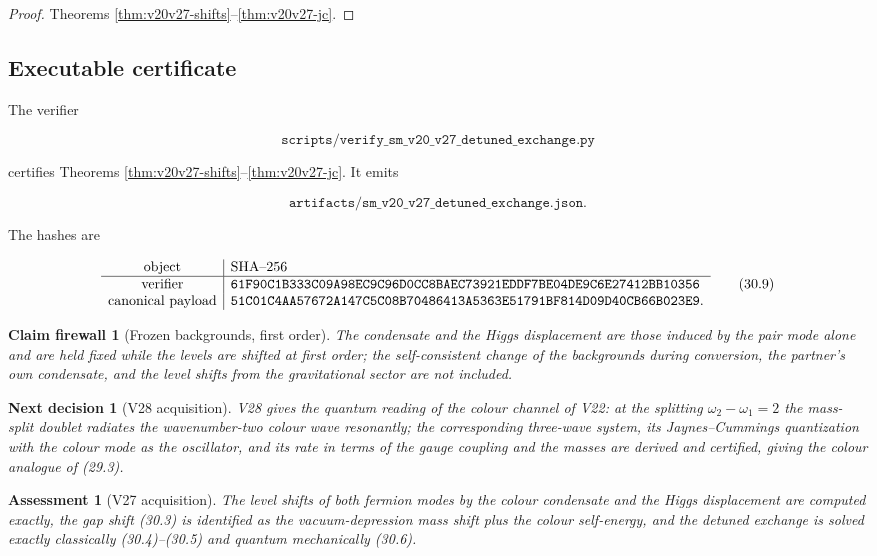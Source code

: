 \documentclass[11pt]{article}
\newtheorem{firewall}[theorem]{Claim firewall}
\newtheorem{decision}[theorem]{Next decision}
\newtheorem{assessment}[theorem]{Assessment}
\theoremstyle{remark}
\begin{document}
\begin{proof}
Theorems \ref{thm:v20v27-shifts}--\ref{thm:v20v27-jc}.
\end{proof}

\subsection{Executable certificate}

The verifier

\[
 \texttt{scripts/verify\_sm\_v20\_v27\_detuned\_exchange.py}          \tag{30.7}
\]

certifies Theorems \ref{thm:v20v27-shifts}--\ref{thm:v20v27-jc}.  It
emits

\[
 \texttt{artifacts/sm\_v20\_v27\_detuned\_exchange.json}.             \tag{30.8}
\]

The hashes are

\[
\begin{array}{c|l}
\hbox{object}&\hbox{SHA--256}\\ \hline
\hbox{verifier}&
\texttt{61F90C1B333C09A98EC9C96D0CC8BAEC73921EDDF7BE04DE9C6E27412BB10356}\\
\hbox{canonical payload}&
\texttt{51C01C4AA57672A147C5C08B70486413A5363E51791BF814D09D40CB66B023E9}.
\end{array}                                                     \tag{30.9}
\]

\begin{firewall}[Frozen backgrounds, first order]
\label{fire:v20v27}
The condensate and the Higgs displacement are those induced by the
pair mode alone and are held fixed while the levels are shifted at
first order; the self-consistent change of the backgrounds during
conversion, the partner's own condensate, and the level shifts from
the gravitational sector are not included.
\end{firewall}

\begin{decision}[V28 acquisition]
\label{dec:v20v27-next}
V28 gives the quantum reading of the colour channel of V22: at the
splitting \(\omega_2-\omega_1=2\) the mass-split doublet radiates the
wavenumber-two colour wave resonantly; the corresponding three-wave
system, its Jaynes--Cummings quantization with the colour mode as the
oscillator, and its rate in terms of the gauge coupling and the
masses are derived and certified, giving the colour analogue of
(29.3).
\end{decision}

\begin{assessment}[V27 acquisition]
\label{ass:v20v27}
The level shifts of both fermion modes by the colour condensate and
the Higgs displacement are computed exactly, the gap shift (30.3) is
identified as the vacuum-depression mass shift plus the colour
self-energy, and the detuned exchange is solved exactly classically
(30.4)--(30.5) and quantum mechanically (30.6).
\end{assessment}
\end{document}
